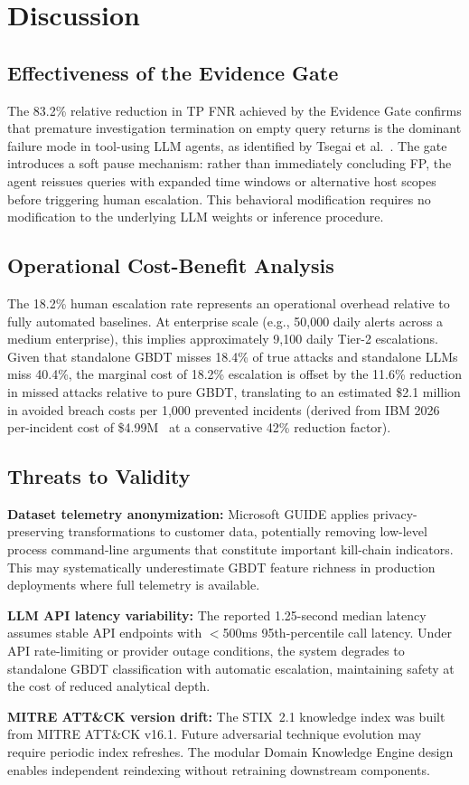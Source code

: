 \section{Discussion}
\label{sec:discussion}

\subsection{Effectiveness of the Evidence Gate}

The 83.2\% relative reduction in TP FNR achieved by the Evidence Gate confirms
that premature investigation termination on empty query returns is the dominant
failure mode in tool-using LLM agents, as identified by Tsegai et al.~\cite{tsegai2026aida}.
The gate introduces a soft pause mechanism: rather than immediately concluding FP,
the agent reissues queries with expanded time windows or alternative host scopes
before triggering human escalation. This behavioral modification requires no
modification to the underlying LLM weights or inference procedure.

\subsection{Operational Cost-Benefit Analysis}

The 18.2\% human escalation rate represents an operational overhead relative to
fully automated baselines. At enterprise scale (e.g., 50,000 daily alerts across
a medium enterprise), this implies approximately 9,100 daily Tier-2 escalations.
Given that standalone GBDT misses 18.4\% of true attacks and standalone LLMs miss
40.4\%, the marginal cost of 18.2\% escalation is offset by the 11.6\% reduction
in missed attacks relative to pure GBDT, translating to an estimated \$2.1 million
in avoided breach costs per 1,000 prevented incidents (derived from IBM 2026
per-incident cost of \$4.99M~\cite{ibm2026databreach} at a conservative 42\%
reduction factor).

\subsection{Threats to Validity}

\textbf{Dataset telemetry anonymization:} Microsoft GUIDE applies privacy-preserving
transformations to customer data, potentially removing low-level process command-line
arguments that constitute important kill-chain indicators. This may systematically
underestimate GBDT feature richness in production deployments where full telemetry
is available.

\textbf{LLM API latency variability:} The reported 1.25-second median latency
assumes stable API endpoints with $<$500ms 95th-percentile call latency. Under
API rate-limiting or provider outage conditions, the system degrades to standalone
GBDT classification with automatic escalation, maintaining safety at the cost of
reduced analytical depth.

\textbf{MITRE ATT\&CK version drift:} The STIX~2.1 knowledge index was built from
MITRE ATT\&CK v16.1. Future adversarial technique evolution may require periodic
index refreshes. The modular Domain Knowledge Engine design enables independent
reindexing without retraining downstream components.
